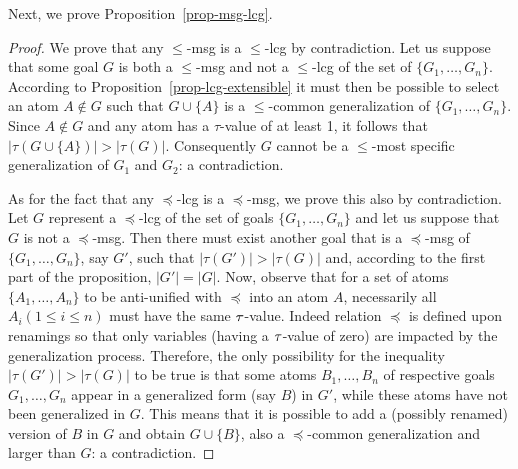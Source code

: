 		Next, we prove Proposition~\ref{prop-msg-lcg}.
		
	\begin{proof}
	We prove that any $\leqslant$-msg is a $\leqslant$-lcg by contradiction. Let us suppose that some goal $G$ is both a $\leqslant$-msg and not a $\leqslant$-lcg of the set of $\{G_1, \dots, G_n\}$. According to Proposition~\ref{prop-lcg-extensible} it must then be possible to select an atom $A \notin G$ such that $G\cup\{A\}$ is a $\leqslant$-common generalization of $\{G_1, \dots, G_n\}$. Since $A\notin G$ and any atom has a $\tau$-value of at least 1, it follows that $|\tau(G\cup\{A\})|>|\tau(G)|$. Consequently $G$ cannot be a $\leqslant$-most specific generalization of $G_1$ and $G_2$: a contradiction.
	
	As for the fact that any $\preceq$-lcg is a $\preceq$-msg, we prove this also by contradiction. Let $G$ represent a $\preceq$-lcg of the set of goals $\{G_1, \dots, G_n\}$ and let us suppose that $G$ is not a $\preceq$-msg. Then there must exist another goal that is a $\preceq$-msg of $\{G_1, \dots, G_n\}$, say $G'$, such that $|\tau(G')|>|\tau(G)|$ and, according to the first part of the proposition, $|G'|=|G|$. 
	Now, observe that for a set of atoms $\{A_1, \dots, A_n\}$ to be anti-unified with $\preceq$ into an atom $A$, necessarily all $A_i (1\le i\le n)$ must have the same $\tau$-value. Indeed relation $\preceq$ is defined upon renamings so that only variables (having a $\tau$-value of zero) are impacted by the generalization process. Therefore, the only possibility for the inequality $|\tau(G')|>|\tau(G)|$ to be true is that some atoms $B_1, \dots, B_n$ of respective goals $G_1,\dots,G_n$ appear in a generalized form (say $B$) in $G'$, while these atoms have not been generalized in $G$. This means that it is possible to add a (possibly renamed) version of $B$ in $G$ and obtain $G\cup\{B\}$, also a $\preceq$-common generalization and larger than $G$: a contradiction.
	\end{proof}

	
